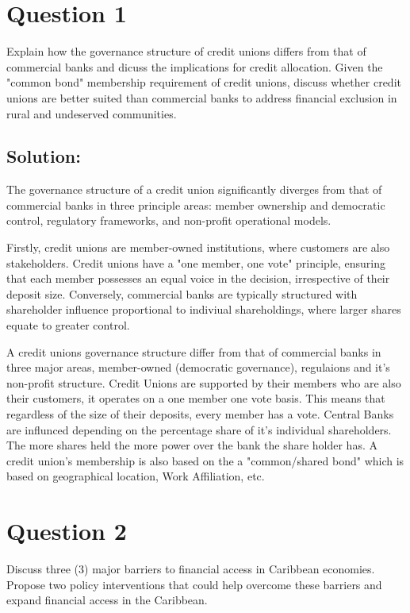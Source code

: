 \newpage

\section*{Question 1} 

Explain how the governance structure of credit unions differs from that of commercial banks and dicuss the implications for credit allocation. Given the 
"common bond" membership requirement of credit unions, discuss whether credit unions are better suited than commercial banks to address financial exclusion in rural 
and undeserved communities. 


\subsection*{Solution:}


The governance structure of a credit union significantly diverges from that of commercial banks in three principle areas: member ownership and democratic control, regulatory frameworks, and 
non-profit operational models.

Firstly, credit unions are member-owned institutions, where customers are also stakeholders. Credit unions have a "one member, one vote" principle, ensuring that each member possesses an equal voice 
in the decision, irrespective of their deposit size. Conversely, commercial banks are typically structured with shareholder influence proportional to indiviual shareholdings, where larger shares equate to 
greater control. 

A credit unions governance structure differ from that of commercial banks in three major areas, member-owned (democratic governance), regulaions and it's non-profit structure. 
Credit Unions are supported by their members who are also their customers, it operates on a one member one vote basis. This means that regardless of the size of their deposits, 
every member has a vote. Central Banks are influnced depending on the percentage share of it's individual shareholders. The more shares held the more power over the bank the share holder has. A credit union's membership 
is also based on the a "common/shared bond" which is based on geographical location, Work Affiliation, etc. 


\section*{Question 2}

Discuss three (3) major barriers to financial access in Caribbean economies. Propose two policy interventions that could help overcome these barriers 
and expand financial access in the Caribbean.

